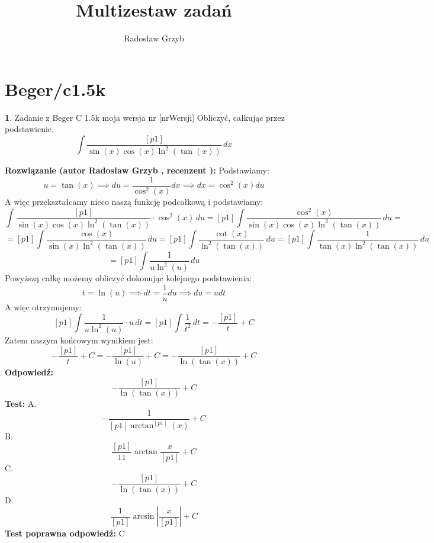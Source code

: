 \documentclass[12pt, a4paper]{article}
\title{Multizestaw zadań}
\author{Radosław Grzyb}
\date{}
\theoremstyle{definition} %
\newtheorem{zad}{}
\newcommand{\kategoria}[1]{\section{#1}} %
\newcommand{\zadStart}[1]{\begin{zad}#1\newline} %
\newcommand{\zadStop}{\end{zad}}   %
\newcommand{\rozwStart}[2]{\noindent \textbf{Rozwiązanie (autor #1 , recenzent #2): }\newline} %
\newcommand{\rozwStop}{\newline}                                            %
\newcommand{\odpStart}{\noindent \textbf{Odpowiedź:}\newline}    %
\newcommand{\odpStop}{\newline}                                             %
\newcommand{\testStart}{\noindent \textbf{Test:}\newline} %
\newcommand{\testStop}{\newline} %
\newcommand{\kluczStart}{\noindent \textbf{Test poprawna odpowiedź:}\newline} %
\newcommand{\kluczStop}{\newline} %
\begin{document}
\maketitle
\kategoria{Beger/c1.5k}
\zadStart{Zadanie z Beger C 1.5k moja wersja nr [nrWersji]}
Obliczyć, całkując przez podstawienie.
$$\int \frac{[p1]}{\sin(x)\cos(x)\ln^2(\tan(x))} \,dx$$
\zadStop
\rozwStart{Radosław Grzyb}{}
Podstawiamy:
$$u=\tan(x)\implies du=\frac{1}{\cos^2(x)} dx \implies dx=\cos^2(x) du$$
A więc przekształcamy nieco naszą funkcję podcałkową i podstawiamy:
$$\int \frac{[p1]}{\sin(x)\cos(x)\ln^2(\tan(x))}\cdot\cos^2(x) \,du=[p1]\int \frac{\cos^2(x)}{\sin(x)\cos(x)\ln^2(\tan(x))}\,du=$$
$$=[p1]\int \frac{\cos(x)}{\sin(x)\ln^2(\tan(x))}\,du=[p1]\int \frac{\cot(x)}{\ln^2(\tan(x))}\,du=[p1]\int \frac{1}{\tan(x)\ln^2(\tan(x))}\,du$$
$$=[p1]\int \frac{1}{u\ln^2(u)}\,du$$
Powyższą całkę możemy obliczyć dokonując kolejnego podstawienia:
$$t=\ln(u)\implies dt=\frac{1}{u} du \implies du=u dt$$
A więc otrzymujemy:
$$[p1]\int \frac{1}{u\ln^2(u)}\cdot u\,dt=[p1]\int \frac{1}{t^2}\,dt=-\frac{[p1]}{t}+C$$
Zatem naszym końcowym wynikiem jest:
$$-\frac{[p1]}{t}+C=-\frac{[p1]}{\ln(u)}+C=-\frac{[p1]}{\ln(\tan(x))}+C$$
\rozwStop
\odpStart
$$-\frac{[p1]}{\ln(\tan(x))}+C$$
\odpStop
\testStart
A.$$-\frac{1}{[p1]\arctan^{[p1]}(x)}+C$$
B.$$\frac{[p1]}{11}\arctan\frac{x}{[p1]}+C$$
C.$$-\frac{[p1]}{\ln(\tan(x))}+C$$
D.$$\frac{1}{[p1]}\arcsin|\frac{x}{[p1]}|+C$$
\testStop
\kluczStart
C
\kluczStop
\end{document}
